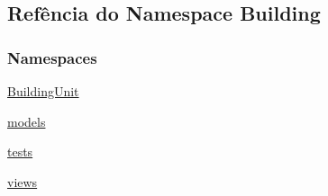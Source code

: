\hypertarget{namespaceBuilding}{\subsection{Refência do Namespace Building}
\label{namespaceBuilding}
}
\subsubsection*{Namespaces}
\begin{DoxyCompactItemize}
\item 
\hyperlink{namespaceBuilding_1_1BuildingUnit}{Building\-Unit}
\item 
\hyperlink{namespaceBuilding_1_1models}{models}
\item 
\hyperlink{namespaceBuilding_1_1tests}{tests}
\item 
\hyperlink{namespaceBuilding_1_1views}{views}
\end{DoxyCompactItemize}
